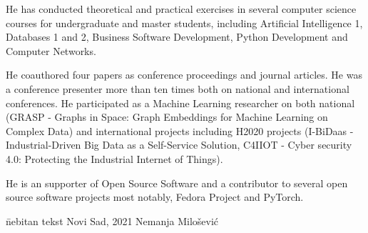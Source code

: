 \documentclass[b5paper]{book}
\begin{document}
He has conducted theoretical and practical exercises in several
computer science courses for undergraduate and master students,
including Artificial Intelligence 1, Databases 1 and 2, Business Software Development, Python Development and Computer Networks.

He coauthored four papers as conference proceedings and
journal articles. He was a conference presenter more than ten times both on national and international conferences. He participated as a Machine Learning researcher on both national (GRASP - Graphs in Space: Graph Embeddings for Machine Learning on Complex Data) and international projects including H2020 projects (I-BiDaas - Industrial-Driven Big Data as a Self-Service Solution, C4IIOT - Cyber security 4.0: Protecting the Industrial Internet of Things).

He is an supporter of Open Source Software and a contributor to several open source software projects most notably, Fedora Project and PyTorch.

\vfill


\begin{tabbing}
  \hspace{0.7\textwidth} \= nebitan tekst \kill
  Novi Sad, 2021 \> Nemanja Milošević
\end{tabbing}
\end{document}
